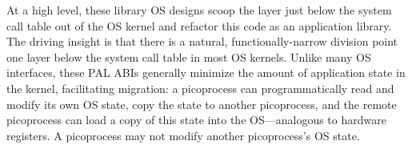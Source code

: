 
At a high level, these library OS designs
scoop the layer just below the system call table out of the OS kernel
and refactor this code as an application library.  
The driving insight is that there is a natural, functionally-narrow division point 
one layer below the system call table
in most OS kernels.
Unlike many OS interfaces, these PAL ABIs generally minimize the amount of application state in the kernel, facilitating
migration: a picoprocess can programmatically read and modify its own OS state,
copy the state to another picoprocess, and the remote picoprocess can 
load a copy of this state into the OS---analogous to hardware registers.
A picoprocess may not modify another picoprocess's OS state.





